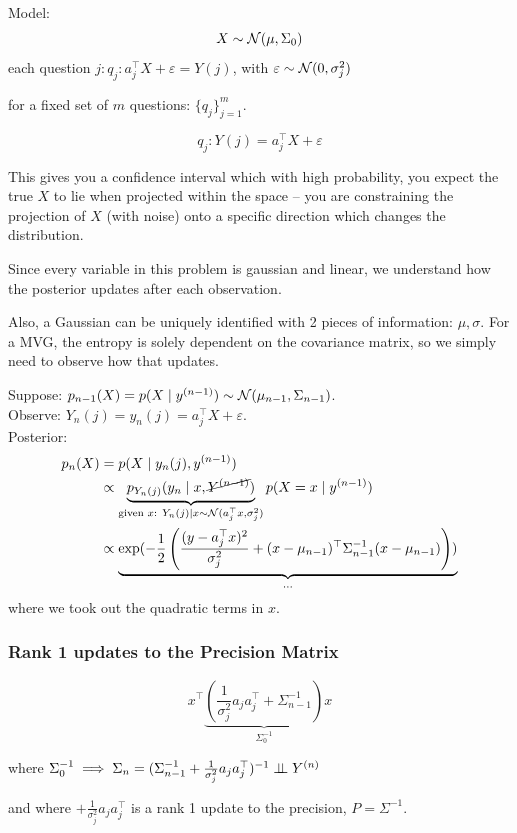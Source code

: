 Model:
$$
X\sim \mathcal{N}(\mu, \Sigma_0)
$$
each question $j: q_j: a_j^\top X + \varepsilon = Y(j)$, with $\varepsilon\sim\mathcal{N}(0, \sigma_j^2)$

for a fixed set of $m$ questions: $\{q_j\}_{j=1}^m$.

\begin{equation}
    q_j : Y(j) = a_j^\top X + \varepsilon
\end{equation}

This gives you a confidence interval which with high probability, you expect the true $X$ to lie when projected within the space -- you are constraining the projection of $X$ (with noise) onto a specific direction which changes the distribution. 

Since every variable in this problem is gaussian and linear, we understand how the posterior updates after each observation.

Also, a Gaussian can be uniquely identified with 2 pieces of information: $\mu, \sigma$. For a MVG, the entropy is solely dependent on the covariance matrix, so we simply need to observe how that updates.

Suppose: $p_{n-1}(X) = p(X\mid y^{(n-1)}) \sim \mathcal{N}(\mu_{n-1}, \Sigma_{n-1})$.\\
Observe: $Y_{n}(j) = y_n(j) = a_j^\top X + \varepsilon$.\\
Posterior: 
\begin{align*}
p_{n}(X) 
&= p(X\mid y_n(j), y^{(n-1)}) 
\\
&\propto 
\underbrace{p_{Y_{n}{(j)}}(y_n\mid x, \cancel{Y^{(n-1)}})}_{\text{given $x$: } Y_n(j)\mid x\sim\mathcal{N}(a_j^\top x, \sigma_j^2)}
p(X=x\mid y^{(n-1)})
\\
&\propto \underbrace{\exp(-\frac12 \left( 
\frac{(y-a_j^\top x)^2}{\sigma_j^2}
+
(x-\mu_{n-1})^\top \Sigma_{n-1}^{-1} (x-\mu_{n-1})
\right))}_{\ldots}
\end{align*}
where we took out the quadratic terms in $x$.

\subsubsection{Rank 1 updates to the Precision Matrix}
$$
x^\top 
\underbrace{(\frac1{\sigma_j^2}a_ja_j^\top + \Sigma_{n-1}^{-1})}_{\Sigma_0^{-1}}
x
$$

where $\Sigma_0^{-1}\implies \Sigma_n=(\Sigma_{n-1}^{-1} + \frac1{\sigma_j^2}a_ja_j^\top)^{-1}\mathrel{\perp\!\!\!\perp} Y^{(n)}$

and where $+ \frac1{\sigma_j^2}a_ja_j^\top$ is a rank 1 update to the precision, $P=\Sigma^{-1}$.

